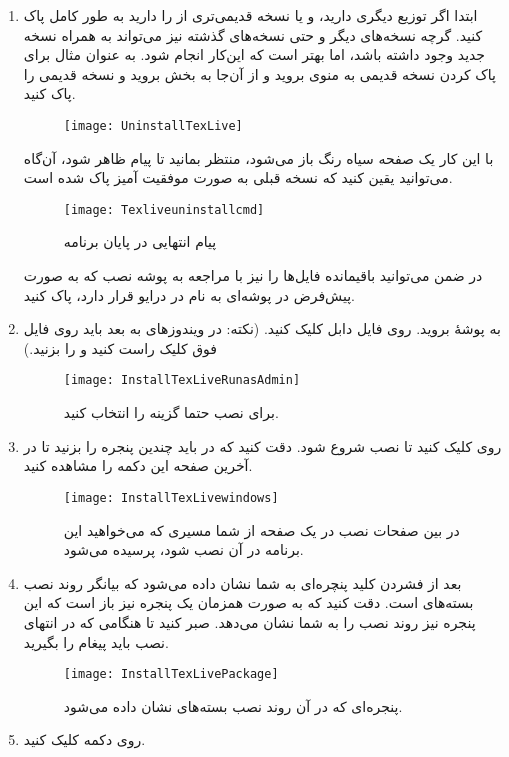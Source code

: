\begin{enumerate}
 \item 
 ابتدا اگر توزیع
  دیگری دارید، و یا نسخه قدیمی‌تری از 
 را دارید به طور کامل پاک کنید. گرچه نسخه‌های دیگر
  و حتی نسخه‌های گذشته 
  نیز می‌تواند به همراه نسخه جدید وجود داشته باشد، اما بهتر است که این‌کار انجام شود. به عنوان مثال برای پاک کردن نسخه قدیمی 
  به منوی  بروید و از آن‌جا به بخش  بروید و  نسخه قدیمی را پاک کنید. 
\begin{figure}[h!]
 \centering\texttt{[image: UninstallTexLive]}
\end{figure}
با این کار یک صفحه سیاه رنگ باز می‌شود، منتظر بمانید تا پیام  ظاهر شود، آن‌گاه می‌توانید یقین کنید که نسخه قبلی  به صورت موفقیت آمیز پاک شده است. 
\begin{figure}[h!]
 \centering\texttt{[image: Texliveuninstallcmd]}
 \caption{پیام انتهایی در پایان  برنامه }
\end{figure}
در ضمن می‌توانید باقیمانده فایل‌ها را نیز با مراجعه به پوشه نصب 
 که به صورت پیش‌فرض در پوشه‌ای به نام  در درایو  قرار دارد، پاک کنید. 
\item
به پوشهٔ 
بروید. روی فایل  دابل کلیک کنید. (نکته: در ویندوزهای  به بعد باید روی فایل فوق کلیک راست کنید و 
را بزنید.) 
\begin{figure}[h!]
 \centering\texttt{[image: InstallTexLiveRunasAdmin]}
 \caption{برای نصب  حتما گزینه  را انتخاب کنید.}
\end{figure}
\item
روی  کلیک کنید تا نصب شروع شود. دقت کنید که در  باید چندین پنجره را 
 بزنید تا در آخرین صفحه این دکمه را مشاهده کنید.
\begin{figure}[h!]
 \centering\texttt{[image: InstallTexLivewindows]}
 \caption{در بین صفحات نصب  در یک صفحه از شما مسیری که می‌خواهید این برنامه در آن نصب شود، پرسیده می‌شود.}
\end{figure}
\item
بعد از فشردن کلید  پنچره‌ای به شما نشان داده می‌شود که بیانگر روند نصب بسته‌های  است. دقت کنید که به صورت همزمان یک پنجره  نیز باز است که این پنجره نیز روند نصب را به شما نشان می‌دهد. صبر کنید تا هنگامی که در انتهای نصب باید پیغام  را بگیرید. 
\begin{figure}[h!]
 \centering\texttt{[image: InstallTexLivePackage]}
 \caption{پنجره‌ای که در آن روند نصب بسته‌های  نشان داده می‌شود.}
\end{figure}
\item
روی دکمه  کلیک کنید. 
\end{enumerate}
